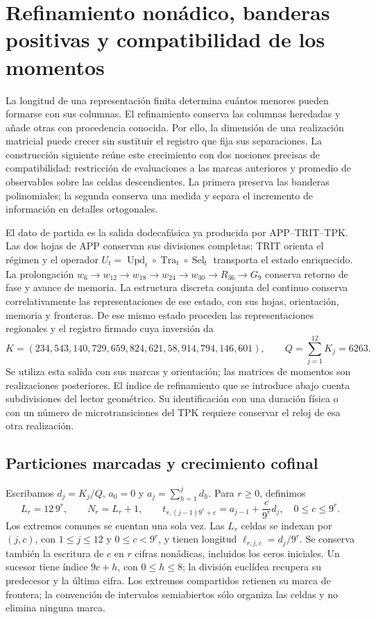\section{Refinamiento nonádico, banderas positivas y compatibilidad de los momentos}
\label{sec:dim-cofinal}

La longitud de una representación finita determina cuántos menores pueden
formarse con sus columnas. El refinamiento conserva las columnas heredadas
y añade otras con procedencia conocida. Por ello, la dimensión de una
realización matricial puede crecer sin sustituir el registro que fija sus
separaciones. La construcción siguiente reúne este crecimiento con dos
nociones precisas de compatibilidad: restricción de evaluaciones a las
marcas anteriores y promedio de observables sobre las celdas descendientes.
La primera preserva las banderas polinomiales; la segunda conserva una
medida y separa el incremento de información en detalles ortogonales.

El dato de partida es la salida dodecafásica ya producida por
APP--TRIT--TPK. Las dos hojas de APP conservan sus divisiones completas;
TRIT orienta el régimen y el operador
\(U_t=\operatorname{Upd}_t\circ\operatorname{Tra}_t\circ
\operatorname{Sel}_t\) transporta el estado enriquecido. La prolongación
\(w_6\to w_{12}\to w_{18}\to w_{24}\to w_{30}\to R_{36}\to G_9\)
conserva retorno de fase y avance de memoria. La estructura discreta conjunta
del continuo conserva correlativamente las representaciones de ese estado,
con sus hojas, orientación, memoria y fronteras. De ese mismo estado proceden
las representaciones regionales y el registro firmado cuya inversión da
\[
 K=(234,543,140,729,659,824,621,58,914,794,146,601),
 \qquad Q=\sum_{j=1}^{12}K_j=6263.
\]
Se utiliza esta salida con sus marcas y orientación; las matrices de
momentos son realizaciones posteriores. El índice de refinamiento que se
introduce abajo cuenta subdivisiones del lector geométrico. Su identificación
con una duración física o con un número de microtransiciones del TPK
requiere conservar el reloj de esa otra realización.

\subsection{Particiones marcadas y crecimiento cofinal}

Escribamos \(d_j=K_j/Q\), \(a_0=0\) y
\(a_j=\sum_{h=1}^j d_h\). Para \(r\geq0\), definimos
\[
 L_r=12\,9^r,\qquad N_r=L_r+1,\qquad
 t_{r,(j-1)9^r+c}=a_{j-1}+\frac{c}{9^r}d_j,
 \quad 0\leq c\leq9^r.
\]
Los extremos comunes se cuentan una sola vez. Las \(L_r\) celdas se
indexan por \((j,c)\), con \(1\leq j\leq12\) y
\(0\leq c<9^r\), y tienen longitud
\(\ell_{r,j,c}=d_j/9^r\). Se conserva también la escritura de \(c\)
en \(r\) cifras nonádicas, incluidos los ceros iniciales. Un sucesor tiene
índice \(9c+h\), con \(0\leq h\leq8\); la división euclídea recupera
su predecesor y la última cifra. Los extremos compartidos retienen su marca
de frontera; la convención de intervalos semiabiertos sólo organiza
las celdas y no elimina ninguna marca.

